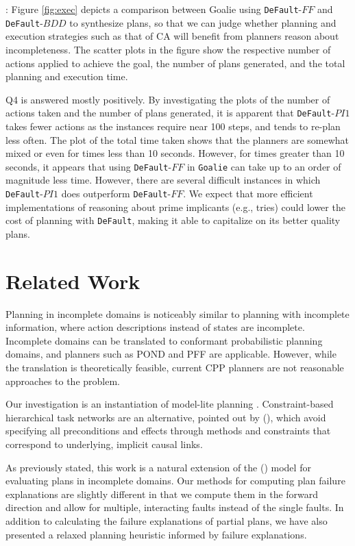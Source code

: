 \documentclass[letterpaper]{article}
\def\und#1{\noindent{\bf #1}:}
\def\default{{\tt DeFault}}
\def\goalie{{\tt Goalie}}
\def\citep#1{\cite{#1}}
\def\citet#1{\citeauthor{#1} (\citeyear{#1})}
\begin{document}
 

\und{On-line Planning and Execution Results} Figure \ref{fig:exec} depicts a
comparison between Goalie using \default{}-$FF$ and \default{}-$BDD$ to
synthesize plans, so that we can judge whether planning and execution strategies
such as that of CA will benefit from planners reason about incompleteness.  The
scatter plots in the figure show the respective number of actions applied to
achieve the goal, the number of plans generated, and the total planning and
execution time.

Q4 is answered mostly positively. By investigating the plots of the number of
actions taken and the number of plans generated, it is apparent that
\default-$PI1$ takes fewer actions as the instances require near 100 steps, and
tends to re-plan less often. The plot of the total time taken shows that the
planners are somewhat mixed or even for times less than 10 seconds.  However,
for times greater than 10 seconds, it appears that using \default-$FF$ in
\goalie{} can take up to an order of magnitude less time.  However, there are
several difficult instances in which \default-$PI1$ does outperform
\default-$FF$.    We expect that more efficient implementations of reasoning
about prime implicants (e.g., tries) could lower the cost of planning with
\default{}, making it able to capitalize on its better quality plans.
 

\section{Related Work}

Planning in incomplete domains is noticeably similar to planning with incomplete
information, where action descriptions instead of states are incomplete. 
Incomplete domains can be translated to conformant probabilistic planning
domains, and planners such as POND \citep{aij-mclug} and PFF \citep{pff} are
applicable.  However, while the translation is theoretically feasible, current
CPP planners are not reasonable approaches to the problem.  


Our investigation is an instantiation of model-lite planning \citep{modellite}.
Constraint-based hierarchical task networks are an alternative, pointed out by
\citet{modellite},  which avoid specifying all preconditions and effects through
methods and constraints that correspond to underlying, implicit causal links.

As previously stated, this work is a natural extension of the \citet{Garland02}
model for evaluating plans in incomplete domains.  Our methods for computing
plan failure explanations are slightly different in that we compute them in the
forward direction and allow for multiple, interacting faults instead of the
single faults.  In addition to calculating the failure explanations of partial
plans, we have also presented a relaxed planning heuristic informed by failure
explanations.
\end{document}
